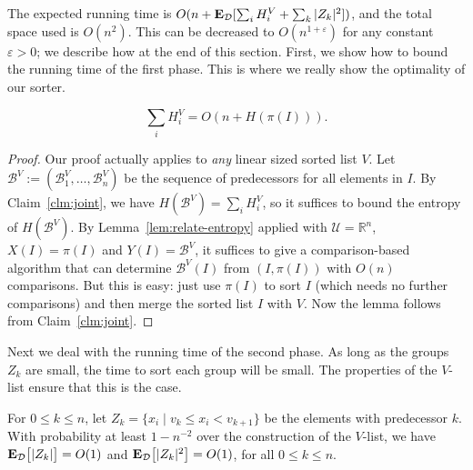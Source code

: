 \documentclass{siamltex}
\newcommand{\D}{\mathcal{D}}
\newcommand{\cU}{\mathcal{U}}
\newcommand{\R}{\mathbb R}
\newcommand{\eps}{\varepsilon}
\newcommand{\EX}{\hbox{\bf E}}
\newcommand{\pred}{\mathcal{B}}
\newcommand{\eqdef}{:=}
\begin{document}
The expected running time is $O(n+ \EX_\D[\sum_i H_i^V + \sum_k |Z_k|^2])$, and 
the total space used is $O(n^2)$. This can be decreased to $O(n^{1+\eps})$
for any constant $\eps > 0$; we describe how at the end of this section.
First, we show how to bound the running time of the first phase.
This is where we really show the optimality of our sorter.
\medskip
\begin{lemma} \label{lem:fredman-revisited}
\[ 
\sum_i H_i^V = O(n + H(\pi(I))). 
\]
\end{lemma}

\begin{proof}
Our proof actually applies to  \emph{any}
linear sized sorted list $V$. 
Let $\pred^V \eqdef (\pred_1^V, \ldots, \pred_n^V)$ be the
sequence of predecessors for all elements in $I$.
By Claim~\ref{clm:joint}, we have $H(\pred^V) = \sum_i H_i^V$,
so it suffices to bound the entropy of $H(\pred^V)$.
By Lemma~\ref{lem:relate-entropy} applied with
$\cU = \R^n$,   $X(I) = \pi(I)$ and $Y(I) = \pred^V$,
it suffices to give a comparison-based algorithm that can
determine $\pred^V(I)$ from $(I, \pi(I))$ with $O(n)$
comparisons. But this is easy: just use $\pi(I)$ to
sort $I$ (which needs no further comparisons) and then
merge the sorted list $I$ with $V$. Now the lemma follows
from Claim~\ref{clm:joint}.
\end{proof}
\medskip

Next we deal with the running time of the second phase. As long
as the groups $Z_k$ are small, the time to sort each group will
be small. The properties of the $V$-list ensure that this is the case.
\medskip
\begin{lemma} \label{lem:quicksort} 
For $0 \leq k \leq n$, let $Z_k =  \{x_i \mid v_k\leq x_i < v_{k+1}\}$
be the elements with predecessor $k$.
With probability at least $1 - n^{-2}$
over the construction of the $V$-list, we have 
$\EX_{\D}\big[|Z_k|\big]= O(1)$
and 
$\EX_{\D}\big[|Z_k|^2\big]= O(1)$, 
for all $0\leq k\leq n$.
\end{lemma}
\end{document}
